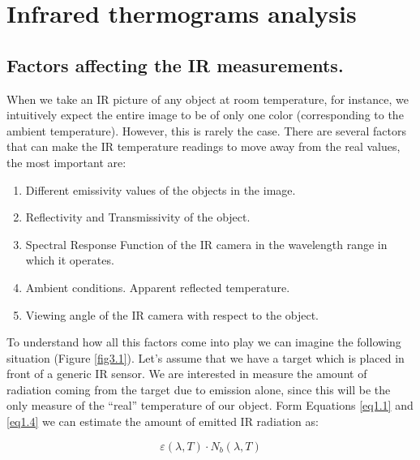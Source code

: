 \pagestyle{standard}

\chapter{Infrared thermograms analysis}\label{chapter3}

	\thispagestyle{chapter-first-page}

	\section{Factors affecting the IR measurements.}\label{section3.1}
	
		When we take an IR picture of any object at room temperature, for instance, we intuitively expect the entire image to be of only one color (corresponding to the ambient temperature). However, this is rarely the case. There  are several factors that can make the IR temperature readings to move away from the real values, the most important are:
		
		\begin{enumerate}[label={\arabic*)}]
			\item Different emissivity values of the objects in the image.
			\item Reflectivity and Transmissivity of the object.
			\item Spectral Response Function of the IR camera in the wavelength range in which it operates.
			\item Ambient conditions. Apparent reflected temperature.
			\item Viewing angle of the IR camera with respect to the object.
		\end{enumerate}
		
		To understand how all this factors come into play we can imagine the following situation (Figure \ref{fig3.1}).  Let's assume that we have a target which is placed in front of a generic IR sensor. We are interested in measure the amount of radiation coming from the target due to emission alone, since this will be the only measure of the “real” temperature of our object. Form Equations \ref{eq1.1} and \ref{eq1.4} we can estimate the amount of emitted IR radiation as: 
		
		\begin{equation}\label{eq3.1}
			\varepsilon(\lambda,T) \cdot N_{b}(\lambda,T)
		\end{equation}	
		
